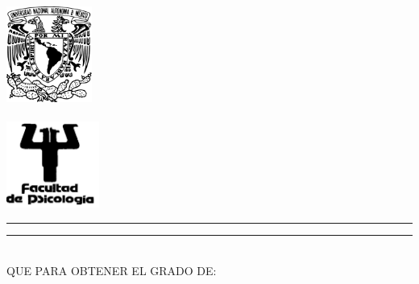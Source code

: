 \documentclass[
12pt, %
spanish, %
singlespacing, %
headsepline, %
]{Tesis_Lab25} %
\author{Adriana Felisa Chávez De la Peña}%
\begin{document}
\frontmatter %

\pagestyle{plain} %


\begin{titlepage}
\begin{minipage}[c][9in][s]{1in}
\centering
\hspace*{-0.2in} \includegraphics[width=1.1in]{Escudo-UNAM}\\[10pt]
\hskip 2pt\vrule width 2pt height 6.7in
\hskip 1mm\vrule width 1pt height 6.7in\\[10pt]
\hspace*{-0.2in} \includegraphics[width=1.2in]{PSI}
\end{minipage}\hskip 10pt
\begin{minipage}[c][\textheight][s]{5.125in}
\centering
{\Large\scshape\univname}
\vspace{3mm}\hrule height2pt
\vspace{1mm}\hrule height1pt
\vspace{3mm}
{\scshape\facname}\par
\vfill\vfill
{\def\baselinestretch{1}\LARGE\scshape\ttitle\par}
\vfill\vfill
\\[8pt]
QUE PARA OBTENER EL GRADO DE:\\[8pt]
{\scshape\degreename}\\[16pt]

\end{minipage}
\end{titlepage}
\end{document}
